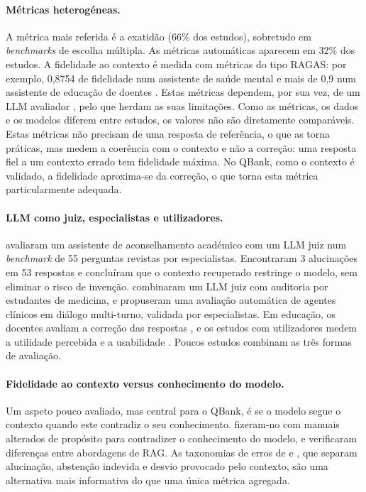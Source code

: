 \paragraph{Métricas heterogéneas.} A métrica mais referida é a exatidão (66\% dos estudos), sobretudo em \emph{benchmarks} de escolha múltipla. As métricas automáticas aparecem em 32\% dos estudos. A fidelidade ao contexto é medida com métricas do tipo \gls{RAGAS}: por exemplo, 0,8754 de fidelidade num assistente de saúde mental \parencite{christiawan2025sanity} e mais de 0,9 num assistente de educação de doentes \parencite{nurfadhilah2025retrieval}. Estas métricas dependem, por sua vez, de um \gls{LLM} avaliador \parencite{nurfadhilah2025retrieval}, pelo que herdam as suas limitações. Como as métricas, os dados e os modelos diferem entre estudos, os valores não são diretamente comparáveis. Estas métricas não precisam de uma resposta de referência, o que as torna práticas, mas medem a coerência com o contexto e não a correção: uma resposta fiel a um contexto errado tem fidelidade máxima. No QBank, como o contexto é validado, a fidelidade aproxima-se da correção, o que torna esta métrica particularmente adequada.

\paragraph{LLM como juiz, especialistas e utilizadores.} \textcite{buti2026evaluating} avaliaram um assistente de aconselhamento académico com um \gls{LLM} juiz num \emph{benchmark} de 55 perguntas revistas por especialistas. Encontraram 3 alucinações em 53 respostas e concluíram que o contexto recuperado restringe o modelo, sem eliminar o risco de invenção. \textcite{liao2026heal} combinaram um \gls{LLM} juiz com auditoria por estudantes de medicina, e \textcite{oh2026automedic} propuseram uma avaliação automática de agentes clínicos em diálogo multi-turno, validada por especialistas. Em educação, os docentes avaliam a correção das respostas \parencite{liu2026asknow,miroyan2025analyzing}, e os estudos com utilizadores medem a utilidade percebida e a usabilidade \parencite{seshadri2026alan,barzanji2026buddy,xu2026echomind}. Poucos estudos combinam as três formas de avaliação.

\paragraph{Fidelidade ao contexto versus conhecimento do modelo.} Um aspeto pouco avaliado, mas central para o QBank, é se o modelo segue o contexto quando este contradiz o seu conhecimento. \textcite{jain2025aligning} fizeram-no com manuais alterados de propósito para contradizer o conhecimento do modelo, e verificaram diferenças entre abordagens de \gls{RAG}. As taxonomias de erros de \textcite{hamidi2026large} e \textcite{rahat2026noise}, que separam alucinação, abstenção indevida e desvio provocado pelo contexto, são uma alternativa mais informativa do que uma única métrica agregada.

